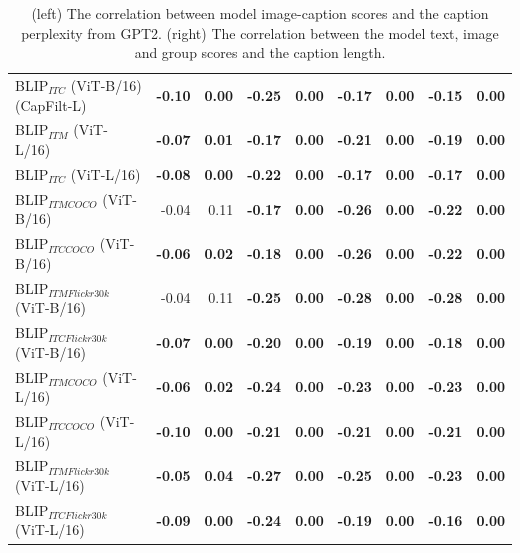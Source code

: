 \begin{table}[ht]
\begin{adjustbox}{max width=\textwidth}
\begin{tabular}{l|rr|rrrrrr}
 BLIP$_{ITC}$ (ViT-B/16) (CapFilt-L) & \textbf{-0.10} & \textbf{0.00} & \textbf{-0.25} & \textbf{0.00} & \textbf{-0.17} & \textbf{0.00} & \textbf{-0.15} & \textbf{0.00} \\
 BLIP$_{ITM}$ (ViT-L/16)             & \textbf{-0.07} & \textbf{0.01} & \textbf{-0.17} & \textbf{0.00} & \textbf{-0.21} & \textbf{0.00} & \textbf{-0.19} & \textbf{0.00} \\
 BLIP$_{ITC}$ (ViT-L/16)             & \textbf{-0.08} & \textbf{0.00} & \textbf{-0.22} & \textbf{0.00} & \textbf{-0.17} & \textbf{0.00} & \textbf{-0.17} & \textbf{0.00} \\
 BLIP$_{ITM COCO}$ (ViT-B/16)        & -0.04          & 0.11          & \textbf{-0.17} & \textbf{0.00} & \textbf{-0.26} & \textbf{0.00} & \textbf{-0.22} & \textbf{0.00} \\
 BLIP$_{ITC COCO}$ (ViT-B/16)        & \textbf{-0.06} & \textbf{0.02} & \textbf{-0.18} & \textbf{0.00} & \textbf{-0.26} & \textbf{0.00} & \textbf{-0.22} & \textbf{0.00} \\
 BLIP$_{ITM Flickr30k}$ (ViT-B/16)   & -0.04          & 0.11          & \textbf{-0.25} & \textbf{0.00} & \textbf{-0.28} & \textbf{0.00} & \textbf{-0.28} & \textbf{0.00} \\
 BLIP$_{ITC Flickr30k}$ (ViT-B/16)   & \textbf{-0.07} & \textbf{0.00} & \textbf{-0.20} & \textbf{0.00} & \textbf{-0.19} & \textbf{0.00} & \textbf{-0.18} & \textbf{0.00} \\
 BLIP$_{ITM COCO}$ (ViT-L/16)        & \textbf{-0.06} & \textbf{0.02} & \textbf{-0.24} & \textbf{0.00} & \textbf{-0.23} & \textbf{0.00} & \textbf{-0.23} & \textbf{0.00} \\
 BLIP$_{ITC COCO}$ (ViT-L/16)        & \textbf{-0.10} & \textbf{0.00} & \textbf{-0.21} & \textbf{0.00} & \textbf{-0.21} & \textbf{0.00} & \textbf{-0.21} & \textbf{0.00} \\
 BLIP$_{ITM Flickr30k}$ (ViT-L/16)   & \textbf{-0.05} & \textbf{0.04} & \textbf{-0.27} & \textbf{0.00} & \textbf{-0.25} & \textbf{0.00} & \textbf{-0.23} & \textbf{0.00} \\
 BLIP$_{ITC Flickr30k}$ (ViT-L/16)   & \textbf{-0.09} & \textbf{0.00} & \textbf{-0.24} & \textbf{0.00} & \textbf{-0.19} & \textbf{0.00} & \textbf{-0.16} & \textbf{0.00} \\
\bottomrule
\end{tabular}
\end{adjustbox}
\caption{(left) The correlation between model image-caption scores and the caption perplexity from GPT2. (right) The correlation between the model text, image and group scores and the caption length.}
\label{tab:perplexity-and-length-correlations-ours}
\end{table}

